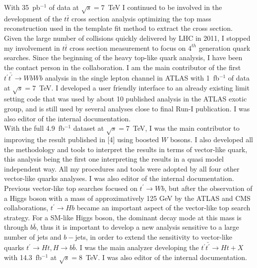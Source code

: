\documentclass[12pt]{article}
\begin{document}
\noindent [3] With 35~pb$^{-1}$ of data at $\sqrt{s}=7$~TeV I continued to be involved in the development of the $t\bar{t}$ cross section analysis optimizing the top mass reconstruction 
used in the template fit method to extract the cross section.\\

\noindent [4] Given the large number of collisions quickly delivered by LHC in 2011, I stopped my involvement in $t\bar{t}$ cross section measurement to focus on $4^{th}$ generation quark searches.
Since the beginning of the heavy top-like quark analysis, I have been the contact person in the collaboration. I am the main contributor of the first $t^{\prime}\bar{t^{\prime}} \rightarrow WbWb$ 
analysis in the single lepton channel in ATLAS with
1~fb$^{-1}$ of data at $\sqrt{s}=7$~TeV. I developed a user friendly interface to an already existing limit setting code that was used by about 10 published analysis in the 
ATLAS exotic group, and is still used by several analyses close to final Run-I publication. I was also editor of the internal documentation.\\

\noindent [5] With the full 4.9~fb$^{-1}$ dataset at $\sqrt{s}=7$~TeV, I was the main contributor to improving the result published in [4] using boosted $W$ bosons. 
I also developed all the methodology and tools to interpret the results in terms of vector-like quark, this analysis being the first one interpreting the results in a quasi model independent 
way. All my procedures and tools were adopted by all four other vector-like quarks analyses. 
I was also editor of the internal documentation.\\

\noindent [6] Previous vector-like top searches focused on $t^{\prime} \rightarrow Wb$, but after the observation of a Higgs boson with a mass of approximatively 125 GeV 
by the ATLAS and CMS collaborations, $t^{\prime} \rightarrow Hb$ became an important aspect of the vector-like top search strategy. 
For a SM-like Higgs boson, the dominant decay mode at this mass is through $b\bar{b}$, thus it is important to develop a new analysis sensitive to a large number of jets and $b-$jets,
in order to extend the sensitivity to vector-like quarks $t^{\prime} \rightarrow Ht, H \rightarrow b\bar{b}$. I was the main analyzer developing the $t^{\prime}\bar{t^{\prime}} \rightarrow Ht+X$ 
with 14.3~fb$^{-1}$ at $\sqrt{s}=8$~TeV. I was also editor of the internal documentation.\\
\end{document}
